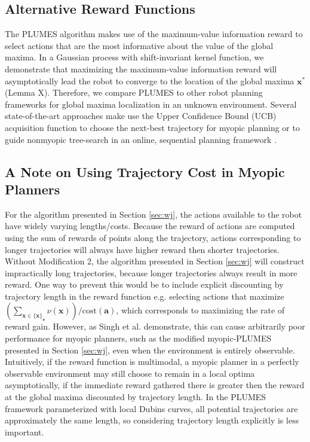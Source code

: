 \documentclass{styles/svproc}
\newcommand{\x}{\mathbf{x}}
\begin{document}
\subsection{Alternative Reward Functions}
The PLUMES algorithm makes use of the maximum-value information reward to select actions that are the most informative about the value of the global maxima. In a Gaussian process with shift-invariant kernel function, we demonstrate that maximizing the maximum-value information reward will asymptotically lead the robot to converge to the location of the global maxima $\x^*$ (Lemma X). Therefore, we compare PLUMES to other robot planning frameworks for global maxima localization in an unknown environment. Several state-of-the-art approaches make use the Upper Confidence Bound (UCB) acquisition function to choose the next-best trajectory for myopic planning \cite{Sun2017} or to guide nonmyopic tree-search in an online, sequential planning framework \cite{Marchant2014a}. %

\subsection{A Note on Using Trajectory Cost in Myopic Planners}
\label{sec:cost}
For the algorithm presented in Section \ref{sec:wj}, the actions available to the robot have widely varying lengths/costs. Because the reward of actions are computed using the sum of rewards of points along the trajectory, actions corresponding to longer trajectories will always have higher reward then shorter trajectories. Without Modification 2, the algorithm presented in Section \ref{sec:wj} will construct impractically long trajectories, because longer trajectories always result in more reward. One way to prevent this would be to include explicit discounting by trajectory length in the reward function e.g. selecting actions that maximize $(\sum_{\x \in \{ \x \}_\mathbf{a}} \nu(\x)) / \text{cost}(\mathbf{a})$, which corresponds to maximizing the rate of reward gain. However, as Singh et al. \cite{singh2009nonmyopic} demonstrate, this can cause arbitrarily poor performance for myopic planners, such as the modified myopic-PLUMES presented in Section \ref{sec:wj}, even when the environment is entirely observable. Intuitively, if the reward function is multimodal, a myopic planner in a perfectly observable environment may still choose to remain in a local optima asymptotically, if the immediate reward gathered there is greater then the reward at the global maxima discounted by trajectory length. In the PLUMES framework parameterized with local Dubins curves, all potential trajectories are approximately the same length, so considering trajectory length explicitly is less important.
\end{document}
